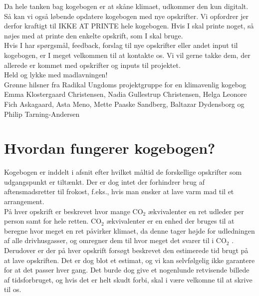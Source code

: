 \documentclass[11pt, a4paper]{article}
\newcommand{\coo}{CO$_2$ }
\begin{document}
Da hele tanken bag kogebogen er at skåne klimaet, udkommer den kun digitalt. Så kan vi også løbende opdatere kogebogen med nye opskrifter. Vi opfordrer jer derfor kraftigt til IKKE AT PRINTE hele kogebogen. Hvis I skal printe noget, så nøjes med at printe den enkelte opskrift, som I skal bruge.\\

Hvis I har spørgsmål, feedback, forslag til nye opskrifter eller andet input til kogebogen, er I meget velkommen til at kontakte os. Vi vil gerne takke dem, der allerede er kommet med opskrifter og inputs til projektet.\\

Held og lykke med madlavningen!\\
Grønne hilsner fra Radikal Ungdoms projektgruppe for en klimavenlig kogebog\\
Emma Klostergaard Christensen, Nadia Gullestrup Christensen, Helga Leonore Fich Askagaard, Asta Meno, Mette Paaske Sandberg, Baltazar Dydensborg og Philip Tarning-Andersen

\section*{Hvordan fungerer kogebogen?}

Kogebogen er inddelt i afsnit efter hvilket måltid de forskellige opskrifter som udgangspunkt er tiltænkt. Der er dog intet der forhindrer brug af aftensmadsretter til frokost, f.eks., hvis man ønsker at lave varm mad til et arrangement. \\

På hver opskrift er beskrevet hvor mange \coo ækvivalenter en ret udleder per person samt for hele retten. \coo ækvivalenter er en enhed der bruges til at beregne hvor meget en ret påvirker klimaet, da denne tager højde for udledningen af alle drivhusgasser, og omregner dem til hvor meget det svarer til i \coo.\\

Derudover er der på hver opskrift forsøgt beskrevet den estimerede tid brugt på at lave opskriften. Det er dog blot et estimat, og vi kan selvfølgelig ikke garantere for at det passer hver gang. Det burde dog give et nogenlunde retvisende billede af tidsforbruget, og hvis det er helt skudt forbi, skal i være velkomne til at skrive til os.

\newpage
\tableofcontents

\vspace{5em}
\newpage


	
\end{document}
